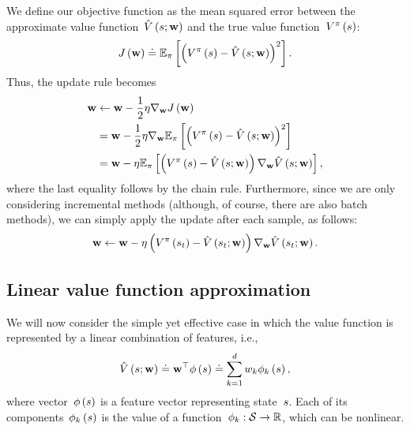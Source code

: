 We define our objective function as the mean squared error between the approximate value function~$\approximatestatevalue\left(\state;\valueparameter\right)$ and the true value function~${\statevalue\policyscript\left(\state\right)}$:
\begin{equation}
	\objective\left(\valueparameter\right)\doteq\mathbb{E}_{\policy}\left[\left(\statevalue\policyscript\left(\state\right)-\approximatestatevalue\left(\state;\valueparameter\right)\right)^{2}\right].
\end{equation}
Thus, the update rule becomes
\begin{align}
	\valueparameter
		&\gets\valueparameter-\frac{1}{2}\gradientstep\nabla_{\valueparameter}\objective\left(\valueparameter\right) \notag \\
		&=\valueparameter-\frac{1}{2}\gradientstep\nabla_{\valueparameter}\mathbb{E}_{\policy}\left[\left(\statevalue\policyscript\left(\state\right)-\approximatestatevalue\left(\state;\valueparameter\right)\right)^{2}\right] \notag \\
		&=\valueparameter-\gradientstep\mathbb{E}_{\policy}\left[\left(\statevalue\policyscript\left(\state\right)-\approximatestatevalue\left(\state;\valueparameter\right)\right)\nabla_{\valueparameter}\approximatestatevalue\left(\state;\valueparameter\right)\right],
\end{align}
where the last equality follows by the chain rule. Furthermore, since we are only considering incremental methods (although, of course, there are also batch methods), we can simply apply the update after each sample, as follows:
\begin{equation}
	\mathbf{w}\gets\mathbf{w}-\eta\left(V^{\pi}\left(s_{t}\right)-\hat{V}\left(s_{t};\mathbf{w}\right)\right)\nabla_{\mathbf{w}}\hat{V}\left(s_{t};\mathbf{w}\right).
\end{equation}

\subsection{Linear value function approximation}
We will now consider the simple yet effective case in which the value function is represented by a linear combination of features, i.e.,
\begin{equation}
	\approximatestatevalue\left(\state;\valueparameter\right)\doteq\valueparameter^{\top}\featurevector\left(\state\right)\doteq\sum_{\indexletter=1}^{\parametersize}\valueparametercomponent_{\indexletter}\featurevectorcomponent_{\indexletter}\left(\state\right),
\end{equation}
where vector~${\featurevector\left(\state\right)}$ is a feature vector representing state~${\state}$. Each of its components~${\featurevectorcomponent_{\indexletter}\left(\state\right)}$ is the value of a function~${\phi_{k}:\mathcal{S}\rightarrow\mathbb{R}}$, which can be nonlinear.

